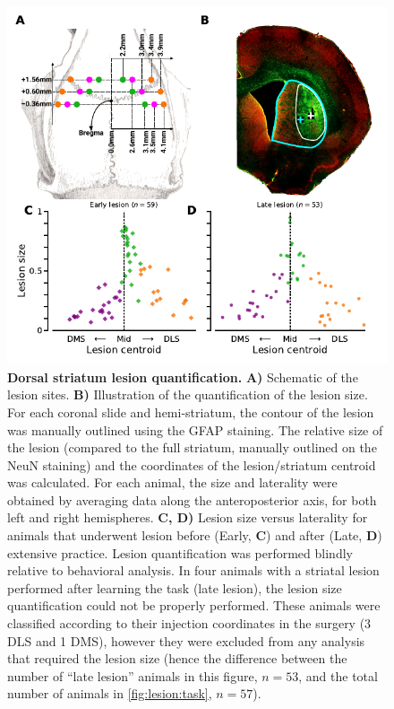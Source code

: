 \begin{figure}[bth!]
	\begin{center}
		\includegraphics[scale=1]{ch-methods/figures/LesionSizeLocation.pdf}
		\caption
		{\textbf{Dorsal striatum lesion quantification.}
		\textbf{A)} Schematic of the lesion sites.
		\textbf{B)} Illustration of the quantification of the lesion size.
		For each coronal slide and hemi-striatum, the contour of the lesion was manually outlined using the GFAP staining.
		The relative size of the lesion (compared to the full striatum, manually outlined on the NeuN staining) and the coordinates of the lesion/striatum centroid was calculated.
		For each animal, the size and laterality were obtained by averaging data along the anteroposterior axis, for both left and right hemispheres.
		\textbf{C, D)} Lesion size versus laterality for animals that underwent lesion before (Early, \textbf{C}) and after (Late, \textbf{D}) extensive practice.
		Lesion quantification was performed blindly relative to behavioral analysis.
		In four animals with a striatal lesion performed after learning the task (late lesion), the lesion size quantification could not be properly performed.
		These animals were classified according to their injection coordinates in the surgery (3 DLS and 1 DMS), however they were excluded from any analysis that required the lesion size (hence the difference between the number of ``late lesion'' animals in this figure, $n=53$, and the total number of animals in \autoref{fig:lesion:task}, $n=57$).
		}
		\label{fig:method:LesionSizeLocation}
	\end{center}
\end{figure}